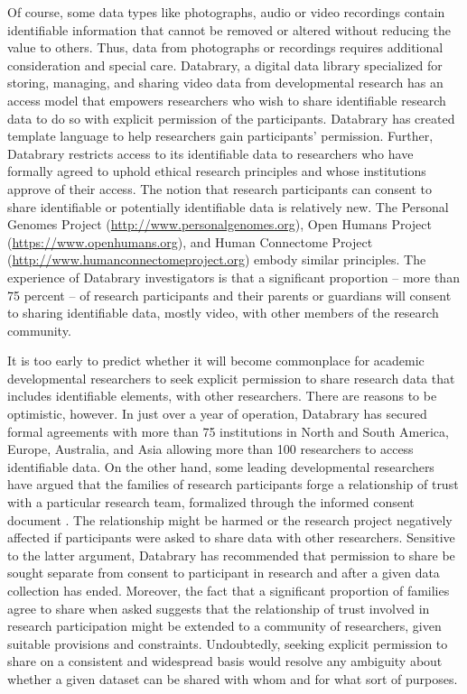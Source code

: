 \documentclass[letterpaper,man,apacite]{apa6}
\begin{document}
Of course, some data types like photographs, audio or video recordings contain identifiable information that cannot be removed or altered without reducing the value to others.
Thus, data from photographs or recordings requires additional consideration and special care.
Databrary, a digital data library specialized for storing, managing, and sharing video data from developmental research has an access model that empowers researchers who wish to share identifiable research data to do so with explicit permission of the participants.
Databrary has created template language to help researchers gain participants' permission.
Further, Databrary restricts access to its identifiable data to researchers who have formally agreed to uphold ethical research principles and whose institutions approve of their access.
The notion that research participants can consent to share identifiable or potentially identifiable data is relatively new.
The Personal Genomes Project (\url{http://www.personalgenomes.org}), Open Humans Project (\url{https://www.openhumans.org}), and Human Connectome Project (\url{http://www.humanconnectomeproject.org}) embody similar principles.
The experience of Databrary investigators is that a significant proportion -- more than 75 percent -- of research participants and their parents or guardians will consent to sharing identifiable data, mostly video, with other members of the research community.

It is too early to predict whether it will become commonplace for academic developmental researchers to seek explicit permission to share research data that includes identifiable elements, with other researchers.
There are reasons to be optimistic, however.
In just over a year of operation, Databrary has secured formal agreements with more than 75 institutions in North and South America, Europe, Australia, and Asia allowing more than 100 researchers to access identifiable data.
On the other hand, some leading developmental researchers have argued that the families of research participants forge a relationship of trust with a particular research team, formalized through the informed consent document \cite{eisenberg_thoughts_2015}.
The relationship might be harmed or the research project negatively affected if participants were asked to share data with other researchers.
Sensitive to the latter argument, Databrary has recommended that permission to share be sought separate from consent to participant in research and after a given data collection has ended.
Moreover, the fact that a significant proportion of families agree to share when asked suggests that the relationship of trust involved in research participation might be extended to a community of researchers, given suitable provisions and constraints.
Undoubtedly, seeking explicit permission to share on a consistent and widespread basis would resolve any ambiguity about whether a given dataset can be shared with whom and for what sort of purposes.
\end{document}
